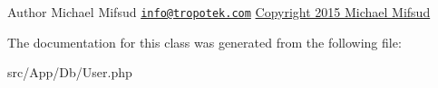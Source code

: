 \begin{DoxyAuthor}{Author}
Michael Mifsud \href{mailto:info@tropotek.com}{\tt info@tropotek.\+com} \hyperlink{}{Copyright 2015 Michael Mifsud }
\end{DoxyAuthor}


The documentation for this class was generated from the following file\+:\begin{DoxyCompactItemize}
\item 
src/\+App/\+Db/User.\+php\end{DoxyCompactItemize}
